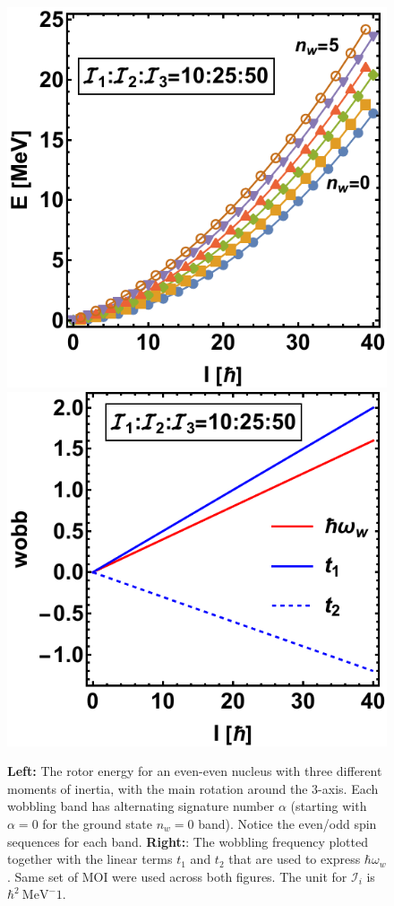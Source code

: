 \begin{figure}
    \centering
    \includegraphics[scale=0.7]{Chapters/Figures/wobbling-evenA.pdf}
    \includegraphics[scale=0.74]{Chapters/Figures/wobblingFreq-evenA.pdf}
    \caption{\textbf{Left:} The rotor energy for an even-even nucleus with three different moments of inertia, with the main rotation around the $3$-axis. Each wobbling band has alternating signature number $\alpha$ (starting with $\alpha=0$ for the ground state $n_w=0$ band). Notice the even/odd spin sequences for each band. \textbf{Right:}: The wobbling frequency plotted together with the linear terms $t_1$ and $t_2$ that are used to express $\hbar\omega_w$. Same set of MOI were used across both figures. The unit for $\mathcal{I}_i$ is $\hbar^2\ \text{MeV}^-1$.}
    \label{fig-even-even-wobbling-energies}
\end{figure}


